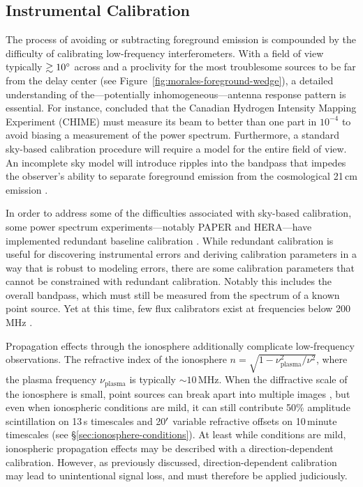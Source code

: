 \begin{bibunit}

\subsection{Instrumental Calibration}

The process of avoiding or subtracting foreground emission is compounded by the difficulty of
calibrating low-frequency interferometers.  With a field of view typically $\gtrsim10\mbox{$^\circ$}$ across
and a proclivity for the most troublesome sources to be far from the delay center (see
Figure~\ref{fig:morales-foreground-wedge}), a detailed understanding of the---potentially
inhomogeneous---antenna response pattern is essential.  For instance, \citet{2015PhRvD..91h3514S}
concluded that the Canadian Hydrogen Intensity Mapping Experiment (CHIME) must measure its beam to
better than one part in $10^{-4}$ to avoid biasing a measurement of the power spectrum.
Furthermore, a standard sky-based calibration procedure will require a model for the entire field of
view. An incomplete sky model will introduce ripples into the bandpass that impedes the observer's
ability to separate foreground emission from the cosmological 21\,cm emission \citep[e.g.,
Figure~\ref{fig:morales-foreground-wedge};][]{2016MNRAS.461.3135B, 2017MNRAS.470.1849E}.

In order to address some of the difficulties associated with sky-based calibration, some power
spectrum experiments---notably PAPER and HERA---have implemented redundant baseline calibration
\citep{2010MNRAS.408.1029L}. While redundant calibration is useful for discovering instrumental
errors and deriving calibration parameters in a way that is robust to modeling errors, there are
some calibration parameters that cannot be constrained with redundant calibration.  Notably this
includes the overall bandpass, which must still be measured from the spectrum of a known point
source. Yet at this time, few flux calibrators exist at frequencies below 200\,MHz
\citep{2012MNRAS.423L..30S, 2017ApJS..230....7P}.

Propagation effects through the ionosphere additionally complicate low-frequency observations. The
refractive index of the ionosphere $n = \sqrt{1 - \nu_\text{plasma}^2/\nu^2}$, where the plasma
frequency $\nu_\text{plasma}$ is typically $\sim10\,\text{MHz}$. When the diffractive scale of the
ionosphere is small, point sources can break apart into multiple images \citep{2015MNRAS.453..925V},
but even when ionospheric conditions are mild, it can still contribute 50\% amplitude scintillation
on 13\,s timescales and 20$\mbox{$^\prime$}$ variable refractive offsets on 10\,minute timescales (see
\S\ref{sec:ionosphere-conditions}).  At least while conditions are mild, ionospheric propagation
effects may be described with a direction-dependent calibration. However, as previously discussed,
direction-dependent calibration may lead to unintentional signal loss, and must therefore be applied
judiciously.


\end{bibunit}
